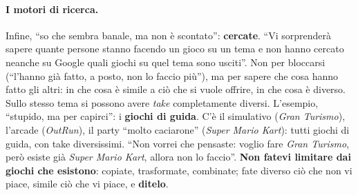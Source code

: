 \paragraph{I motori di ricerca.} Infine, ``so che sembra banale, ma non è scontato'':
\textbf{cercate}. ``Vi sorprenderà sapere quante persone stanno facendo un gioco su un
tema e non hanno cercato neanche su Google quali giochi su quel tema sono usciti''.
Non per bloccarsi (``l'hanno già fatto, a posto, non lo faccio più''), ma per sapere
che cosa hanno fatto gli altri: in che cosa è simile a ciò che si vuole offrire, in che
cosa è diverso. Sullo stesso tema si possono avere \emph{take} completamente diversi.
L'esempio, ``stupido, ma per capirci'': i \textbf{giochi di guida}. C'è il simulativo
(\emph{Gran Turismo}), l'arcade (\emph{OutRun}), il party ``molto caciarone''
(\emph{Super Mario Kart}): tutti giochi di guida, con take diversissimi. ``Non vorrei
che pensaste: voglio fare \emph{Gran Turismo}, però esiste già \emph{Super Mario Kart},
allora non lo faccio''. \textbf{Non fatevi limitare dai giochi che esistono}: copiate,
trasformate, combinate; fate diverso ciò che non vi piace, simile ciò che vi piace, e
\textbf{ditelo}.

